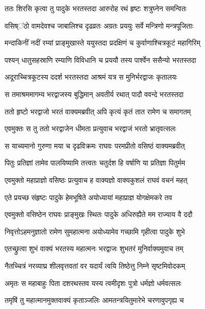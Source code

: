 
\twolineshloka
{ततः शिरसि कृत्वा तु पादुके भरतस्तदा}
{आरुरोह रथं हृष्टः शत्रुघ्नेन समन्वितः} %

\twolineshloka
{वसिष्ऺठो वामदेवश्च जाबालिश्च दृढव्रतः}
{अग्रतः प्रययुः सर्वे मन्त्रिणो मन्त्रपूजिताः} %

\twolineshloka
{मन्दाकिनीं नदीं रम्यां प्राङ्मुखास्ते ययुस्तदा}
{प्रदक्षिणं च कुर्वाणाश्चित्रकूटं महागिरिम्} %

\twolineshloka
{पश्यन् धातुसहस्राणि रम्याणि विविधानि च}
{प्रययौ तस्य पार्श्वेन ससैन्यो भरतस्तदा} %

\twolineshloka
{अदूराच्चित्रकूटस्य ददर्श भरतस्तदा}
{आश्रमं यत्र स मुनिर्भरद्वाजः कृतालयः} %

\twolineshloka
{स तमाश्रममागम्य भरद्वाजस्य बुद्धिमान्}
{अवतीर्य रथात् पादौ ववन्दे भरतस्तदा} %

\twolineshloka
{ततो हृष्टो भरद्वाजो भरतं वाक्यमब्रवीत्}
{अपि कृत्यं कृतं तात रामेण च समागतम्} %

\twolineshloka
{एवमुक्तः स तु ततो भरद्वाजेन धीमता}
{प्रत्युवाच भरद्वाजं भरतो भ्रातृवत्सलः} %

\twolineshloka
{स याच्यमानो गुरुणा मया च दृढविक्रमः}
{राघवः परमप्रीतो वसिष्ठं वाक्यमब्रवीत्} %

\twolineshloka
{पितुः प्रतिज्ञां तामेव पालयिष्यामि तत्त्वतः}
{चतुर्दश हि वर्षाणि या प्रतिज्ञा पितुर्मम} %

\twolineshloka
{एवमुक्तो महाप्राज्ञो वसिष्ठः प्रत्युवाच ह}
{वाक्यज्ञो वाक्यकुशलं राघवं वचनं महत्} %

\twolineshloka
{एते प्रयच्छ संहृष्टः पादुके हेमभूषिते}
{अयोध्यायां महाप्राज्ञ योगक्षेमकरे तव} %

\twolineshloka
{एवमुक्तो वसिष्ठेन राघवः प्राङ्मुखः स्थितः}
{पादुके अधिरुह्यैते मम राज्याय वै ददौ} %

\twolineshloka
{निवृत्तोऽहमनुज्ञातो रामेण सुमहात्मना}
{अयोध्यामेव गच्छामि गृहीत्वा पादुके शुभे} %

\twolineshloka
{एतच्छ्रुत्वा शुभं वाक्यं भरतस्य महात्मनः}
{भरद्वाजः शुभतरं मुनिर्वाक्यमुवाच तम्} %

\twolineshloka
{नैतच्चित्रं नरव्याघ्र शीलवृत्तवतां वर}
{यदार्यं त्वयि तिष्ठेत्तु निम्ने सृष्टमिवोदकम्} %

\twolineshloka
{अमृतः स महाबाहुः पिता दशरथस्तव}
{यस्य त्वमीदृशः पुत्रो धर्मज्ञो धर्मवत्सलः} %

\twolineshloka
{तमृषिं तु महात्मानमुक्तवाक्यं कृताञ्जलिः}
{आमतन्त्रयितुमारेभे चरणावुपगृह्य च} %

